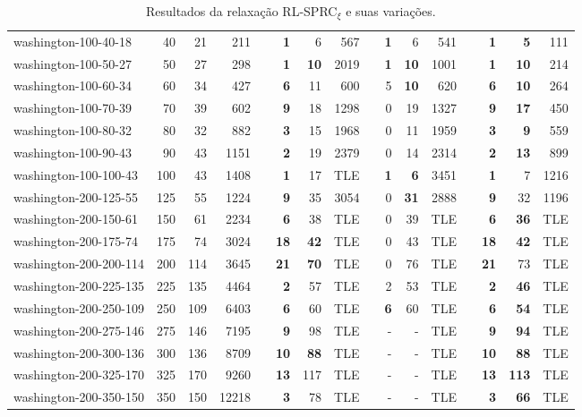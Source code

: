 \begin{table}[!ht]
{\begin{tabular}{lrrrrrrrrrrrlrrr}
washington-100-40-18 & 40 & 21 & 211 &  & \textbf{1} & 6 & 567 &  & \textbf{1} & 6 & 541 &  & \textbf{1} & \textbf{5} & 111 \\
washington-100-50-27 & 50 & 27 & 298 &  & \textbf{1} & \textbf{10} & 2019 &  & \textbf{1} & \textbf{10} & 1001 &  & \textbf{1} & \textbf{10} & 214 \\
washington-100-60-34 & 60 & 34 & 427 &  & \textbf{6} & 11 & 600 &  & 5 & \textbf{10} & 620 &  & \textbf{6} & \textbf{10} & 264 \\
washington-100-70-39 & 70 & 39 & 602 &  & \textbf{9} & 18 & 1298 &  & 0 & 19 & 1327 &  & \textbf{9} & \textbf{17} & 450 \\
washington-100-80-32 & 80 & 32 & 882 &  & \textbf{3} & 15 & 1968 &  & 0 & 11 & 1959 &  & \textbf{3} & \textbf{9} & 559 \\
washington-100-90-43 & 90 & 43 & 1151 &  & \textbf{2} & 19 & 2379 &  & 0 & 14 & 2314 &  & \textbf{2} & \textbf{13} & 899 \\
washington-100-100-43 & 100 & 43 & 1408 &  & \textbf{1} & 17 & TLE &  & \textbf{1} & \textbf{6} & 3451 &  & \textbf{1} & 7 & 1216 \\ \hline
washington-200-125-55 & 125 & 55 & 1224 &  & \textbf{9} & 35 & 3054 &  & 0 & \textbf{31} & 2888 &  & \textbf{9} & 32 & 1196 \\
washington-200-150-61 & 150 & 61 & 2234 &  & \textbf{6} & 38 & TLE &  & 0 & 39 & TLE &  & \textbf{6} & \textbf{36} & TLE \\
washington-200-175-74 & 175 & 74 & 3024 &  & \textbf{18} & \textbf{42} & TLE &  & 0 & 43 & TLE &  & \textbf{18} & \textbf{42} & TLE \\
washington-200-200-114 & 200 & 114 & 3645 &  & \textbf{21} & \textbf{70} & TLE &  & 0 & 76 & TLE &  & \textbf{21} & 73 & TLE \\
washington-200-225-135 & 225 & 135 & 4464 &  & \textbf{2} & 57 & TLE &  & 2 & 53 & TLE &  & \textbf{2} & \textbf{46} & TLE \\
washington-200-250-109 & 250 & 109 & 6403 &  & \textbf{6} & 60 & TLE &  & \textbf{6} & 60 & TLE &  & \textbf{6} & \textbf{54} & TLE \\
washington-200-275-146 & 275 & 146 & 7195 &  & \textbf{9} & 98 & TLE &  & - & - & TLE &  & \textbf{9} & \textbf{94} & TLE \\
washington-200-300-136 & 300 & 136 & 8709 &  & \textbf{10} & \textbf{88} & TLE &  & - & - & TLE &  & \textbf{10} & \textbf{88} & TLE \\
washington-200-325-170 & 325 & 170 & 9260 &  & \textbf{13} & 117 & TLE &  & - & - & TLE &  & \textbf{13} & \textbf{113} & TLE \\
washington-200-350-150 & 350 & 150 & 12218 &  & \textbf{3} & 78 & TLE &  & - & - & TLE &  & \textbf{3} & \textbf{66} & TLE \\ \hline
\end{tabular}%
}
\caption{Resultados da relaxação RL-SPRC$_{\xi}$ e suas variações.}
\label{tab:rl-sprc-xi}
\end{table}

